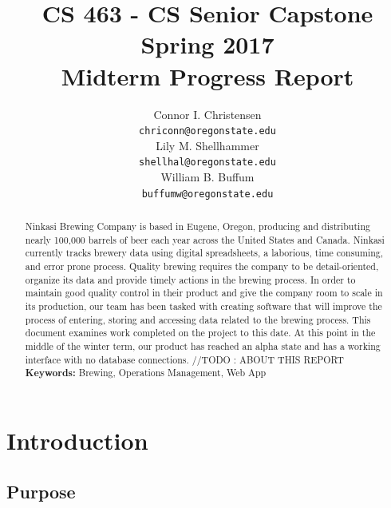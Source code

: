 \documentclass[draftclsnofoot,onecolumn,letterpaper,10pt,compsoc]{IEEEtran}
\title{CS 463 - CS Senior Capstone
	\\Spring 2017
	\\Midterm Progress Report
}
\author{
	Connor I. Christensen \\
	\texttt{chriconn@oregonstate.edu}
	\\
	Lily M. Shellhammer \\
	\texttt{shellhal@oregonstate.edu}
	\\
	William B. Buffum \\
	\texttt{buffumw@oregonstate.edu}
}
\begin{document}
\begin{titlingpage}
    \maketitle
    \begin{abstract}
			Ninkasi Brewing Company is based in Eugene, Oregon, producing and distributing nearly 100,000 barrels of beer each year across the United States and Canada.
			Ninkasi currently tracks brewery data using digital spreadsheets, a laborious, time consuming, and error prone process.
			Quality brewing requires the company to be detail-oriented, organize its data and provide timely actions in the brewing process.
			In order to maintain good quality control in their product and give the company room to scale in its production, our team has been tasked with creating software that will improve the process of entering, storing and accessing data related to the brewing process.
			This document examines work completed on the project to this date.
			At this point in the middle of the winter term, our product has reached an alpha state and has a working interface with no database connections.
			//TODO : ABOUT THIS REPORT
			\\
			\textbf{Keywords:} Brewing, Operations Management, Web App
    \end{abstract}
		\pagebreak
		\tableofcontents
\end{titlingpage}


\section{Introduction}

\subsection{Purpose}
\end{document}
